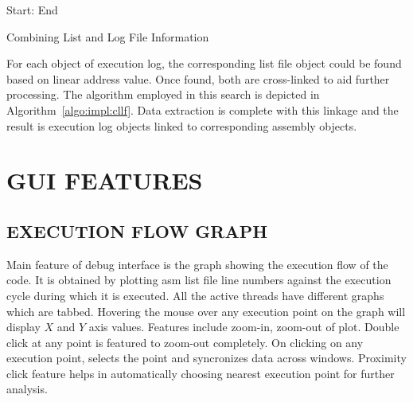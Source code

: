 
\IncMargin{1em}
\begin{algorithm}[h]
\DontPrintSemicolon
{} 

\BlankLine
Start: \;
End \;
\caption{Combining List and Log File Information}
\label{algo:impl:cllf}
\end{algorithm}\DecMargin{1em}


For each object of execution log, the corresponding list file object could be found based on linear address value. Once found, both are cross-linked to aid further processing. The algorithm employed in this search is depicted in Algorithm~\ref{algo:impl:cllf}. Data extraction is complete with this linkage and the result is execution log objects linked to corresponding assembly objects.

\section {GUI FEATURES}

\subsection {EXECUTION FLOW GRAPH}
Main feature of debug interface is the graph showing the execution flow of the code. It is obtained by plotting asm list file line numbers against the execution cycle during which it is executed. All the active threads have different graphs which are tabbed. Hovering the mouse over any execution point on the graph will display $X$ and $Y$ axis values. Features include zoom-in, zoom-out of plot. Double click at any point is featured to zoom-out completely. On clicking on any execution point, selects the point and syncronizes data across windows. Proximity click feature helps in automatically choosing nearest execution point for further analysis.
 
